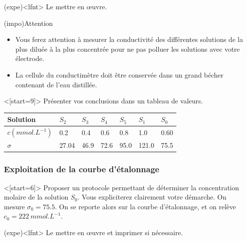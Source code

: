 \documentclass[../main/main.tex]{subfiles}
\begin{document}
\begin{tcb}(expe)<lfnt>{}
	Le mettre en œuvre.
\end{tcb}
\begin{tcb}(impo){Attention}
	\begin{itemize}
		\item Vous ferez attention à mesurer la conductivité des différentes
		      solutions de la plus diluée à la plus concentrée pour ne pas polluer les
		      solutions avec votre électrode.
		\item La cellule du conductimètre doit être conservée dans un grand bécher
		      contenant de l'eau distillée.
	\end{itemize}
\end{tcb}

\QR<[start=9]>{%
	Présenter vos conclusions dans un tableau de valeurs.
}{%
	\begin{center}
		\renewcommand{\arraystretch}{1.3}
		\begin{tabularx}{\linewidth}{|Y*{6}{|Y}|}\hline
			Solution               &
			$S_2$                  &
			$S_3$                  &
			$S_4$                  &
			$S_5$                  &
			$S_1$                  &
			$S_0$
			\\\hline
			$c (\si{mmol.L^{-1}})$ &
			\num{0.2}              &
			\num{0.4}              &
			\num{0.6}              &
			\num{0.8}              &
			\num{1.0}              &
			\num{0.60}
			\\\hline
			$\sigma$               &
			\num{27.04}            &
			\num{46.9}             &
			\num{72.6}             &
			\num{95.0}             &
			\num{121.0}            &
			\num{75.5}
			\\\hline
		\end{tabularx}
	\end{center}
}

\subsubsection{Exploitation de la courbe d'étalonnage}

\QR<[start=6]>{%
	Proposer un protocole permettant de déterminer la concentration molaire de la
	solution $S_0$. Vous expliciterez clairement votre démarche.
}{%
	On mesure $\sigma_0 = \num{75.5}$. On se reporte alors sur la courbe d'étalonnage,
	et on relève $c_0 = \SI{222}{mmol.L^{-1}}$.
}

\begin{tcb}(expe)<lfnt>{}
	Le mettre en œuvre et imprimer si nécessaire.
\end{tcb}
\end{document}
